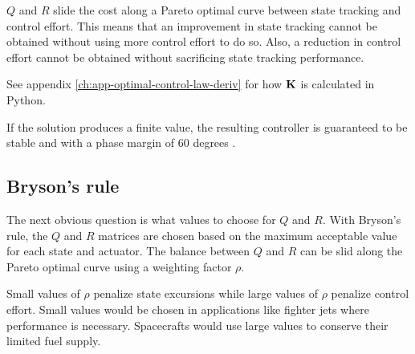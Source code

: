 $Q$ and $R$ slide the cost along a Pareto optimal curve between state tracking
and control effort. This means that an improvement in state tracking cannot be
obtained without using more control effort to do so. Also, a reduction in
control effort cannot be obtained without sacrificing state tracking
performance.

See appendix \ref{ch:app-optimal-control-law-deriv} for how $\mathbf{K}$ is
calculated in Python.

If the solution produces a finite value, the resulting controller is guaranteed
to be stable and  with a \gls{phase margin} of 60
degrees \cite{bib:lqr-derivs}.

\subsection{Bryson's rule}

The next obvious question is what values to choose for $Q$ and $R$. With
Bryson's rule, the $Q$ and $R$ matrices are chosen based on the maximum
acceptable value for each \gls{state} and actuator. The balance between $Q$ and
$R$ can be slid along the Pareto optimal curve using a weighting factor $\rho$.

Small values of $\rho$ penalize \gls{state} excursions while large values of
$\rho$ penalize control effort. Small values would be chosen in applications
like fighter jets where performance is necessary. Spacecrafts would use large
values to conserve their limited fuel supply.
